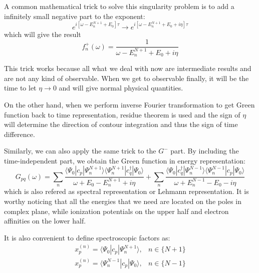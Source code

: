 A common mathematical trick to solve this singularity problem is to add a infinitely small negative part to the exponent:
\begin{equation}
e^{i\left[\omega-E_{n}^{N+1}+E_{0}\right] \tau} \rightarrow e^{i\left[\omega-E_{n}^{N+1}+E_{0}+i\eta\right] \tau}
\end{equation}
which will give the result
\begin{equation}
f_{n}^{+}(\omega)=\frac{1}{\omega-E_{n}^{N+1}+E_{0}+i \eta}
\end{equation}

This trick works because all what we deal with now are intermediate results and are not any kind of observable.
When we get to observable finally, it will be the time to let $\eta \rightarrow 0$ and will give normal physical quantities.

On the other hand, when we perform inverse Fourier transformation to get Green function back to time representation, residue theorem is used and the sign of $\eta$ will determine the direction of contour integration and thus the sign of time difference.

Similarly, we can also apply the same trick to the $G^{-}$ part.
By including the time-independent part, we obtain the Green function in energy representation:
\begin{equation} \label{spectralrepresentation}
G_{p q}(\omega)=\sum_{n} \frac{\langle\Psi_{0}|c_{p}| \Psi_{n}^{N+1}\rangle\langle\Psi_{n}^{N+1}|c_{q}^{\dagger}| \Psi_{0}\rangle}{\omega+E_{0}-E_{n}^{N+1}+i \eta}+\sum_{n} \frac{\langle\Psi_{0}|c_{q}^{\dagger}| \Psi_{n}^{N-1}\rangle\langle\Psi_{n}^{N-1}|c_{p}| \Psi_{0}\rangle}{\omega+E_{n}^{N-1}-E_{0}-i \eta}
\end{equation}
which is also refered as spectral representation or Lehmann representation.
It is worthy noticing that all the energies that we need are located on the poles in complex plane, while ionization potentials on the upper half and electron affinities on the lower half.

It is also convenient to define spectroscopic factors as:
\begin{equation}
\begin{array}{ll}{x_{p}^{(n)}=\langle\Psi_{0}|c_{p}| \Psi_{n}^{N+1}\rangle,} & { n \in\{N+1\}} \\ {x_{p}^{(n)}=\langle\Psi_{n}^{N-1}|c_{p}| \Psi_{0}\rangle,} & { n \in\{N-1\}}\end{array}
\end{equation}

